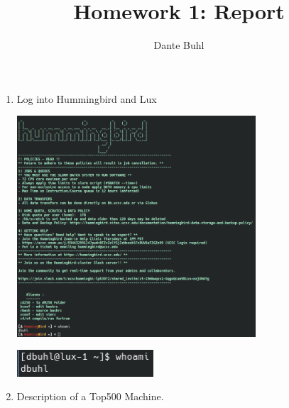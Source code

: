 \documentclass{article}
\title{Homework 1: Report}
\author{Dante Buhl}
\begin{document}
\newcommand{\bs}[1]{\boldsymbol{#1}}
\newcommand{\bmp}[1]{\begin{minipage}{#1\textwidth}}
\newcommand{\emp}{\end{minipage}}
\newcommand{\R}{\mathbb{R}}
\newcommand{\C}{\mathbb{C}}
\newcommand{\N}{\mathcal{N}}
\newcommand{\I}{\mathrm{I}}
\newcommand{\K}{\bs{\mathrm{K}}}
\newcommand{\m}{\bs{\mu}_*}
\newcommand{\s}{\bs{\Sigma}_*}
\newcommand{\dt}{\Delta t}
\newcommand{\tr}[1]{\text{Tr}(#1)}
\newcommand{\Tr}[1]{\text{Tr}(#1)}

\maketitle



\begin{enumerate}
    
\item Log into Hummingbird and Lux

\begin{center}

    \includegraphics[width=0.7\textwidth]{../hummingbird.png}

    \includegraphics[width=0.4\textwidth]{../lux.png}

\end{center}
 
\item Description of a Top500 Machine. 


\end{enumerate}
\end{document}
